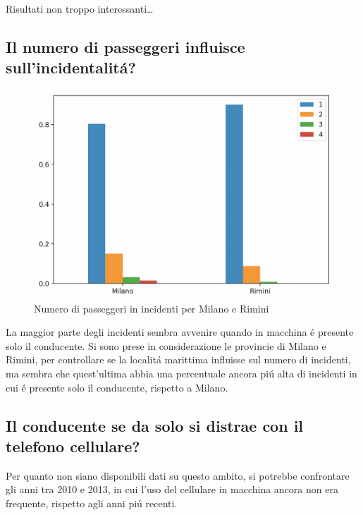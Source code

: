 \documentclass[a4paper]{report}
\begin{document}
Risultati non troppo interessanti\dots


\newpage
\subsection{Il numero di passeggeri influisce sull'incidentalit\'a?}

\begin{figure}[!ht]
    \includegraphics[width=\linewidth]{../src/incidenti/incidenti_senza_coords/tipo_veicoli/passeggeri.png}
    \caption{Numero di passeggeri in incidenti per Milano e Rimini}
    \label{fig:passeggeri_milano_rimini}
\end{figure}

La maggior parte degli incidenti sembra avvenire quando in macchina \'e presente solo il conducente.
Si sono prese in considerazione le provincie di Milano e Rimini, per controllare se la localit\'a 
marittima influisse sul numero di incidenti, ma sembra che quest'ultima abbia una percentuale 
ancora pi\'u alta di incidenti in cui \'e presente solo il conducente, rispetto a Milano.

\subsection{Il conducente se da solo si distrae con il telefono cellulare?}

Per quanto non siano disponibili dati su questo ambito, si potrebbe confrontare gli anni tra 2010 e 2013, 
in cui l'uso del cellulare in macchina ancora non era frequente, rispetto agli anni pi\'u recenti.

\end{document}
